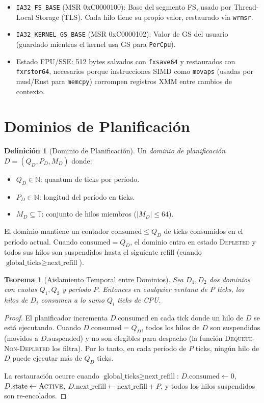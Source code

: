 \documentclass[11pt,twoside,openright]{book}
\theoremstyle{definition}
\newtheorem{definition}{Definición}[chapter]
\theoremstyle{plain}
\newtheorem{theorem}{Teorema}[chapter]
\theoremstyle{remark}
\begin{document}
\begin{itemize}
    \item \texttt{IA32\_FS\_BASE} (MSR 0xC0000100): Base del segmento FS, usado por
          Thread-Local Storage (TLS). Cada hilo tiene su propio valor, restaurado via
          \texttt{wrmsr}.
    \item \texttt{IA32\_KERNEL\_GS\_BASE} (MSR 0xC0000102): Valor de GS del usuario
          (guardado mientras el kernel usa GS para \texttt{PerCpu}).
    \item Estado FPU/SSE: 512 bytes salvados con \texttt{fxsave64} y restaurados con
          \texttt{fxrstor64}, necesarios porque instrucciones SIMD como \texttt{movaps}
          (usadas por musl/Rust para \texttt{memcpy}) corrompen registros XMM entre
          cambios de contexto.
\end{itemize}

\section{Dominios de Planificación}

\begin{definition}[Dominio de Planificación]
\label{def:sched-domain}
Un \emph{dominio de planificación} $D = (Q_D, P_D, M_D)$ donde:
\begin{itemize}
    \item $Q_D \in \mathbb{N}$: quantum de ticks por período.
    \item $P_D \in \mathbb{N}$: longitud del período en ticks.
    \item $M_D \subseteq \mathbb{T}$: conjunto de hilos miembros ($|M_D| \leq 64$).
\end{itemize}
El dominio mantiene un contador $\text{consumed} \leq Q_D$ de ticks consumidos en el
período actual. Cuando $\text{consumed} = Q_D$, el dominio entra en estado
\textsc{Depleted} y todos sus hilos son suspendidos hasta el siguiente refill
(cuando $\text{global\_ticks} \geq \text{next\_refill}$).
\end{definition}

\begin{theorem}[Aislamiento Temporal entre Dominios]
\label{thm:domain-isolation}
Sea $D_1, D_2$ dos dominios con cuotas $Q_1, Q_2$ y período $P$. Entonces en cualquier
ventana de $P$ ticks, los hilos de $D_i$ consumen a lo sumo $Q_i$ ticks de CPU.
\end{theorem}

\begin{proof}
El planificador incrementa $D.\text{consumed}$ en cada tick donde un hilo de $D$ se está
ejecutando. Cuando $D.\text{consumed} = Q_D$, todos los hilos de $D$ son suspendidos
(movidos a $D.\text{suspended}$) y no son elegibles para despacho (la función
\textsc{Dequeue-Non-Depleted} los filtra). Por lo tanto, en cada período de $P$ ticks,
ningún hilo de $D$ puede ejecutar más de $Q_D$ ticks.

La restauración ocurre cuando $\text{global\_ticks} \geq \text{next\_refill}$:
$D.\text{consumed} \gets 0$, $D.\text{state} \gets \textsc{Active}$,
$D.\text{next\_refill} \gets \text{next\_refill} + P$, y todos los hilos suspendidos
son re-encolados.
\end{proof}
\end{document}
